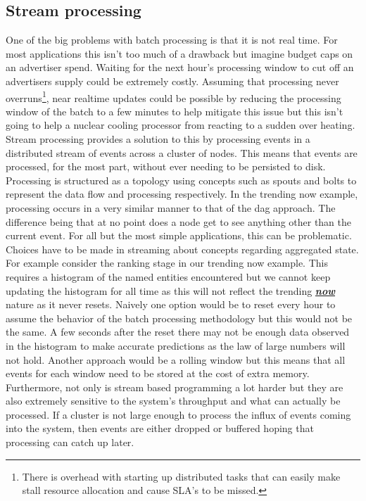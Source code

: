 \documentclass[a4paper,11pt]{scrreprt}
\begin{document}
\subsection{Stream processing}
One of the big problems with batch processing is that it is not real time. For most applications this isn't too much of a drawback but imagine budget caps on an advertiser spend. Waiting for the next hour's processing window to cut off an advertisers supply could be extremely costly. Assuming that processing never overruns\footnote{There is overhead with starting up distributed tasks that can easily make stall resource allocation and cause SLA's to be missed.}, near realtime updates could be possible by reducing the processing window of the batch to a few minutes to help mitigate this issue but this isn't going to help a nuclear cooling processor from reacting to a sudden over heating. Stream processing provides a solution to this by processing events in a distributed stream of events across a cluster of nodes. This means that events are processed, for the most part, without ever needing to be persisted to disk. Processing is structured as a topology using concepts such as spouts and bolts to represent the data flow and processing respectively. In the trending now example, processing occurs in a very similar manner to that of the \acrshort{dag} approach. The difference being that at no point does a node get to see anything other than the current event. For all but the most simple applications, this can be problematic. \\

Choices have to be made in streaming about concepts regarding aggregated state. For example consider the ranking stage in our trending now example. This requires a histogram of the named entities encountered but we cannot keep updating the histogram for all time as this will not reflect the trending \textbf{\textit{\underline{now}}} nature as it never resets. Naively one option would be to reset every hour to assume the behavior of the batch processing methodology but this would not be the same. A few seconds after the reset there may not be enough data observed in the histogram to make accurate predictions as the law of large numbers will not hold. Another approach would be a rolling window but this means that all events for each window need to be stored at the cost of extra memory. Furthermore, not only is stream based programming a lot harder but they are also extremely sensitive to the system's throughput and what can actually be processed. If a cluster is not large enough to process the influx of events coming into the system, then events are either dropped or buffered hoping that processing can catch up later.\\
\end{document}
